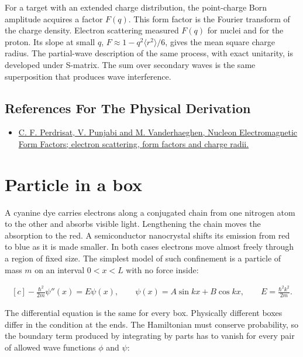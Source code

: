\documentclass[11pt,oneside]{book}
\newenvironment{centeredalign}{\[\begin{gathered}[c]}{\end{gathered}\]}
\begin{document}
For a target with an extended charge distribution, the point-charge Born amplitude acquires a factor \(F(q)\). This form factor is the Fourier transform of the charge density. Electron scattering measured \(F(q)\) for nuclei and for the proton. Its slope at small \(q\), \(F\approx1-q^2\langle r^2\rangle/6\), gives the mean square charge radius. The partial-wave description of the same process, with exact unitarity, is developed under S-matrix. The sum over secondary waves is the same superposition that produces wave interference.

\subsection*{References For The Physical Derivation}
\begin{itemize}
\item \href{https://arxiv.org/abs/hep-ph/0612014}{C. F. Perdrisat, V. Punjabi and M. Vanderhaeghen, Nucleon Electromagnetic Form Factors; electron scattering, form factors and charge radii.}
\end{itemize}





\clearpage

\section{Particle in a box}

\label{topic:particle-in-a-box}

A cyanine dye carries electrons along a conjugated chain from one nitrogen atom to the other and absorbs visible light. Lengthening the chain moves the absorption to the red. A semiconductor nanocrystal shifts its emission from red to blue as it is made smaller. In both cases electrons move almost freely through a region of fixed size. The simplest model of such confinement is a particle of mass \(m\) on an interval \(0<x<L\) with no force inside:

\begin{centeredalign}
-\frac{\hbar^2}{2m}\psi''(x)=E\psi(x),\qquad
\psi(x)=A\sin kx+B\cos kx,\qquad E=\frac{\hbar^2k^2}{2m}.
\end{centeredalign}

The differential equation is the same for every box. Physically different boxes differ in the condition at the ends. The Hamiltonian must conserve probability, so the boundary term produced by integrating by parts has to vanish for every pair of allowed wave functions \(\phi\) and \(\psi\):
\end{document}
